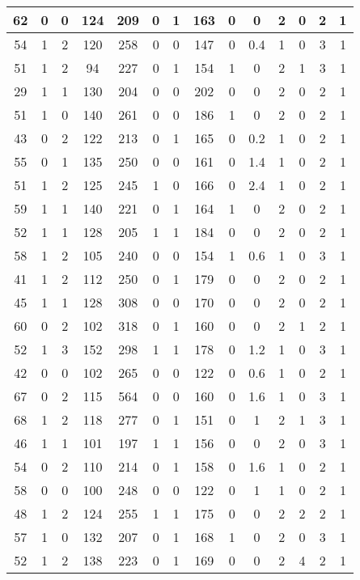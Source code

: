 \documentclass{article}
\begin{document}
\begin{longtable}{|c|c|c|c|c|c|c|c|c|c|c|c|c|c|}
\hline
62 & 0 & 0 & 124 & 209 & 0 & 1 & 163 & 0 & 0 & 2 & 0 & 2 & 1\\
\hline
54 & 1 & 2 & 120 & 258 & 0 & 0 & 147 & 0 & 0.4 & 1 & 0 & 3 & 1\\
\hline
51 & 1 & 2 & 94 & 227 & 0 & 1 & 154 & 1 & 0 & 2 & 1 & 3 & 1\\
\hline
29 & 1 & 1 & 130 & 204 & 0 & 0 & 202 & 0 & 0 & 2 & 0 & 2 & 1\\
\hline
51 & 1 & 0 & 140 & 261 & 0 & 0 & 186 & 1 & 0 & 2 & 0 & 2 & 1\\
\hline
43 & 0 & 2 & 122 & 213 & 0 & 1 & 165 & 0 & 0.2 & 1 & 0 & 2 & 1\\
\hline
55 & 0 & 1 & 135 & 250 & 0 & 0 & 161 & 0 & 1.4 & 1 & 0 & 2 & 1\\
\hline
51 & 1 & 2 & 125 & 245 & 1 & 0 & 166 & 0 & 2.4 & 1 & 0 & 2 & 1\\
\hline
59 & 1 & 1 & 140 & 221 & 0 & 1 & 164 & 1 & 0 & 2 & 0 & 2 & 1\\
\hline
52 & 1 & 1 & 128 & 205 & 1 & 1 & 184 & 0 & 0 & 2 & 0 & 2 & 1\\
\hline
58 & 1 & 2 & 105 & 240 & 0 & 0 & 154 & 1 & 0.6 & 1 & 0 & 3 & 1\\
\hline
41 & 1 & 2 & 112 & 250 & 0 & 1 & 179 & 0 & 0 & 2 & 0 & 2 & 1\\
\hline
45 & 1 & 1 & 128 & 308 & 0 & 0 & 170 & 0 & 0 & 2 & 0 & 2 & 1\\
\hline
60 & 0 & 2 & 102 & 318 & 0 & 1 & 160 & 0 & 0 & 2 & 1 & 2 & 1\\
\hline
52 & 1 & 3 & 152 & 298 & 1 & 1 & 178 & 0 & 1.2 & 1 & 0 & 3 & 1\\
\hline
42 & 0 & 0 & 102 & 265 & 0 & 0 & 122 & 0 & 0.6 & 1 & 0 & 2 & 1\\
\hline
67 & 0 & 2 & 115 & 564 & 0 & 0 & 160 & 0 & 1.6 & 1 & 0 & 3 & 1\\
\hline
68 & 1 & 2 & 118 & 277 & 0 & 1 & 151 & 0 & 1 & 2 & 1 & 3 & 1\\
\hline
46 & 1 & 1 & 101 & 197 & 1 & 1 & 156 & 0 & 0 & 2 & 0 & 3 & 1\\
\hline
54 & 0 & 2 & 110 & 214 & 0 & 1 & 158 & 0 & 1.6 & 1 & 0 & 2 & 1\\
\hline
58 & 0 & 0 & 100 & 248 & 0 & 0 & 122 & 0 & 1 & 1 & 0 & 2 & 1\\
\hline
48 & 1 & 2 & 124 & 255 & 1 & 1 & 175 & 0 & 0 & 2 & 2 & 2 & 1\\
\hline
57 & 1 & 0 & 132 & 207 & 0 & 1 & 168 & 1 & 0 & 2 & 0 & 3 & 1\\
\hline
52 & 1 & 2 & 138 & 223 & 0 & 1 & 169 & 0 & 0 & 2 & 4 & 2 & 1\\

\end{longtable}
\end{document}
